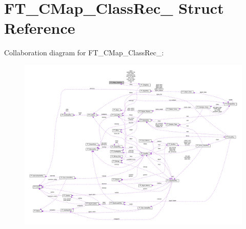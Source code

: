 \hypertarget{structFT__CMap__ClassRec__}{}\section{F\+T\+\_\+\+C\+Map\+\_\+\+Class\+Rec\+\_\+ Struct Reference}
\label{structFT__CMap__ClassRec__}


Collaboration diagram for F\+T\+\_\+\+C\+Map\+\_\+\+Class\+Rec\+\_\+\+:
\nopagebreak
\begin{figure}[H]
\begin{center}
\leavevmode
\includegraphics[width=350pt]{structFT__CMap__ClassRec____coll__graph}
\end{center}
\end{figure}
